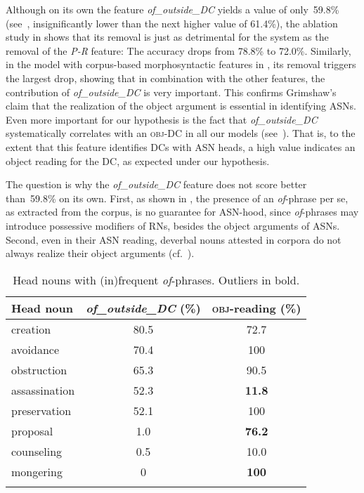 \documentclass[output=paper]{langsci/langscibook}
\begin{document}
Although on its own the feature \textit{of\_outside\_DC} yields a value of only~59.8\% (see~, insignificantly lower than the  {next higher value of} 61.4\%), the ablation study in  shows that its removal is just as detrimental for the system as the removal of the \textit{P-R} feature: The accuracy drops from 78.8\% to 72.0\%. Similarly, in the model with corpus-based morphosyntactic features in , its removal triggers the largest drop, showing that in combination with the other features, the contribution of \textit{of\_outside\_DC} is very important. This confirms Grimshaw's claim that the realization of the object argument is essential in identifying ASNs. Even more important for our hypothesis is the fact that \textit{\textit{of}\_outside\_DC} systematically correlates with an \textsc{obj}-DC in all our models (see~). That is, to the extent that this feature identifies DCs with ASN heads, a high value indicates an object reading for the DC, as expected under our hypothesis.


The question is why the \textit{of\_outside\_DC} feature  does not score better than~59.8\% on its own.  {First, as shown in , the presence of an \textit{of}-phrase per se, as extracted from the corpus, is no guarantee for ASN-hood, since \textit{of}-phrases may introduce possessive modifiers of RNs, besides the object arguments of ASNs. Second,} even in their ASN reading, deverbal nouns attested in corpora do not always realize their object arguments (cf.~\citealt{grimm:mcnally:13}). 

  
\begin{table}
\caption{\label{tab:ex:of:phrases}Head nouns with (in)frequent \textit{of}-phrases. Outliers in bold.}
\begin{tabular}{lSS}
\lsptoprule
{Head noun}& {\textit{of\_outside\_DC} (\%)}& {\textsc{obj}-reading (\%)}\\
\midrule
creation&80.5&72.7\\ 
avoidance&70.4&100\\
obstruction&65.3&90.5\\   
assassination&52.3&\bfseries 11.8\\ 
preservation&52.1&100\\   
proposal&1.0&\bfseries 76.2\\ 
counseling&0.5&10.0\\
mongering&0& \bfseries 100\\
\lspbottomrule
\end{tabular}
\end{table}
\end{document}
